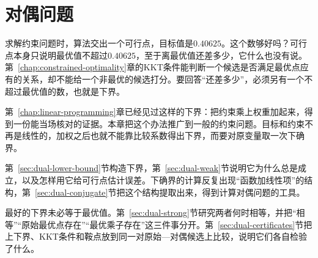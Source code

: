 \chapter{对偶问题}
\label{chap:duality}

求解约束问题时，算法交出一个可行点，目标值是$0.40625$。这个数够好吗？可行点本身只说明最优值不超过$0.40625$，至于离最优值还差多少，它什么也没有说。第~\ref{chap:constrained-optimality}章的KKT条件能判断一个候选是否满足最优点应有的关系，却不能给一个非最优的候选打分。要回答“还差多少”，必须另有一个不超过最优值的数，也就是下界。

第~\ref{chap:linear-programming}章已经见过这样的下界：把约束乘上权重加起来，得到一份能当场核对的证据。本章把这个办法推广到一般的约束问题。目标和约束不再是线性的，加权之后也就不能靠比较系数得出下界，而要对原变量取一次下确界。

第~\ref{sec:dual-lower-bound}节构造下界，第~\ref{sec:dual-weak}节说明它为什么总是成立，以及怎样用它给可行点估计误差。下确界的计算反复出现“函数加线性项”的结构，第~\ref{sec:dual-conjugate}节把这个结构提取出来，得到计算对偶问题的工具。

最好的下界未必等于最优值。第~\ref{sec:dual-strong}节研究两者何时相等，并把“相等”“原始最优点存在”“最优乘子存在”这三件事分开。第~\ref{sec:dual-certificates}节把上下界、KKT条件和鞍点放到同一对原始—对偶候选上比较，说明它们各自检验了什么。







